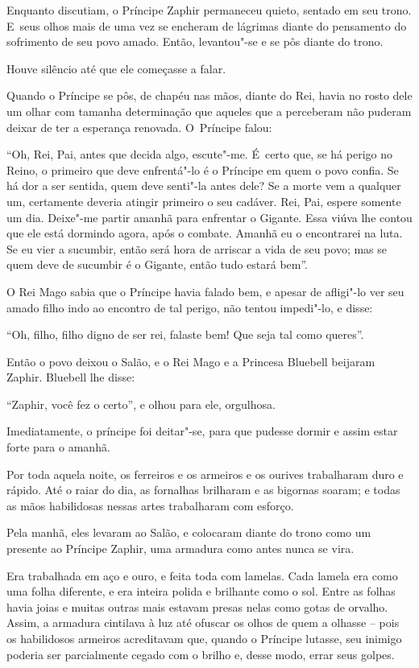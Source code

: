 Enquanto discutiam, o Príncipe Zaphir permaneceu quieto, sentado em seu
trono. E~seus olhos mais de uma vez se encheram de lágrimas diante do
pensamento do sofrimento de seu povo amado. Então, levantou"-se e se pôs
diante do trono.

Houve silêncio até que ele começasse a falar.

Quando o Príncipe se pôs, de chapéu nas mãos, diante do Rei, havia no
rosto dele um olhar com tamanha determinação que aqueles que a
perceberam não puderam deixar de ter a esperança renovada. O~Príncipe
falou:

``Oh, Rei, Pai, antes que decida algo, escute"-me. É~certo que, se há
perigo no Reino, o primeiro que deve enfrentá"-lo é o Príncipe em quem o
povo confia. Se há dor a ser sentida, quem deve senti"-la antes dele? Se
a morte vem a qualquer um, certamente deveria atingir primeiro o seu
cadáver. Rei, Pai, espere somente um dia. Deixe"-me partir amanhã para
enfrentar o Gigante. Essa viúva lhe contou que ele está dormindo agora,
após o combate. Amanhã eu o encontrarei na luta. Se eu vier a sucumbir,
então será hora de arriscar a vida de seu povo; mas se quem deve de
sucumbir é o Gigante, então tudo estará bem''.

O Rei Mago sabia que o Príncipe havia falado bem, e apesar de afligi"-lo
ver seu amado filho indo ao encontro de tal perigo, não tentou
impedi"-lo, e disse:



``Oh, filho, filho digno de ser rei, falaste bem! Que seja tal como
queres''.

Então o povo deixou o Salão, e o Rei Mago e a Princesa Bluebell beijaram
Zaphir. Bluebell lhe disse:

``Zaphir, você fez o certo'', e olhou para ele, orgulhosa.

Imediatamente, o príncipe foi deitar"-se, para que pudesse dormir e assim
estar forte para o amanhã.

Por toda aquela noite, os ferreiros e os armeiros e os ourives
trabalharam duro e rápido. Até o raiar do dia, as fornalhas brilharam e
as bigornas soaram; e todas as mãos habilidosas nessas artes trabalharam
com esforço.

Pela manhã, eles levaram ao Salão, e colocaram diante do trono como um
presente ao Príncipe Zaphir, uma armadura como antes nunca se vira.

Era trabalhada em aço e ouro, e feita toda com lamelas. Cada lamela era
como uma folha diferente, e era inteira polida e brilhante como o sol.
Entre as folhas havia joias e muitas outras mais estavam presas nelas
como gotas de orvalho. Assim, a armadura cintilava à luz até ofuscar os
olhos de quem a olhasse -- pois os habilidosos armeiros acreditavam que,
quando o Príncipe lutasse, seu inimigo poderia ser parcialmente cegado
com o brilho e, desse modo, errar seus golpes.

